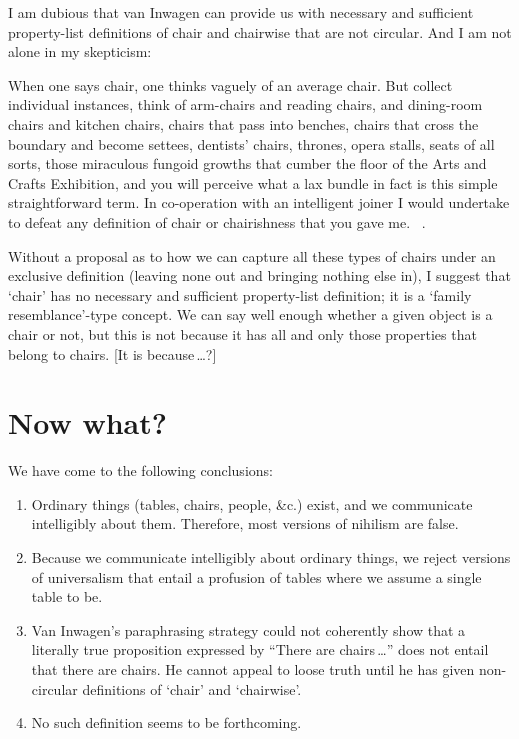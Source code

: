 \documentclass[11pt]{article}
\newenvironment{squote}{%
	\begin{spacing}{1}
	\begin{list}{}{%
	\setlength{\labelwidth}{0pt}%
	\rightmargin\leftmargin%
	}
	\item\relax
	}{%
	\end{list}%
	\end{spacing}
	}
\begin{document}
\begin{spacing}{1.5}
I am dubious that van Inwagen can provide us with necessary and sufficient property-list definitions of chair and chairwise that are not circular. And I am not alone in my skepticism:
\begin{squote}
When one says chair, one thinks vaguely of an average chair. But collect individual instances, think of arm-chairs and reading chairs, and dining-room chairs and kitchen chairs, chairs that pass into benches, chairs that cross the boundary and become settees, dentists' chairs, thrones, opera stalls, seats of all sorts, those miraculous fungoid growths that cumber the floor of the Arts and Crafts Exhibition, and you will perceive what a lax bundle in fact is this simple straightforward term. In co-operation with an intelligent joiner I would undertake to defeat any definition of chair or chairishness that you gave me.%
~\citep[384--385]{wells1904}.
\end{squote}

Without a proposal as to how we can capture all these types of chairs under an exclusive definition (leaving none out and bringing nothing else in), I suggest that `chair' has no necessary and sufficient property-list definition; it is a `family resemblance'-type concept. We can say well enough whether a given object is a chair or not, but this is not because it has all and only those properties that belong to chairs. [It is because\,\ldots ?]

\section{Now what?}
We have come to the following conclusions:
\begin{enumerate}
	\item Ordinary things (tables, chairs, people, \&c.) exist, and we communicate intelligibly about them. Therefore, most versions of nihilism are false.
	\item Because we communicate intelligibly about ordinary things, we reject versions of universalism that entail a profusion of tables where we assume a single table to be.
	\item Van Inwagen's paraphrasing strategy could not coherently show that a literally true proposition expressed by ``There are chairs\,\ldots '' does not entail that there are chairs. He cannot appeal to loose truth until he has given non-circular definitions of `chair' and `chairwise'.
	\item No such definition seems to be forthcoming.
\end{enumerate}


\end{spacing}
\end{document}

